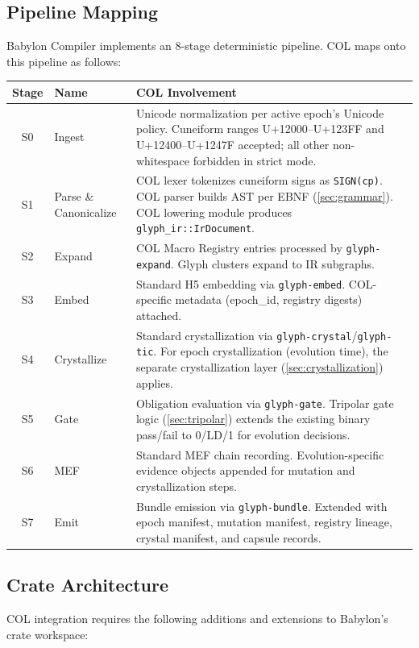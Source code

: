 \documentclass[11pt,a4paper,twoside]{article}
\theoremstyle{definition}
\theoremstyle{remark}
\begin{document}
\subsection{Pipeline Mapping}

Babylon Compiler implements an 8-stage deterministic pipeline. COL maps onto this pipeline as follows:

\begin{longtable}{clp{8.5cm}}
\toprule
\textbf{Stage} & \textbf{Name} & \textbf{COL Involvement} \\
\midrule
\endfirsthead
S0 & Ingest & Unicode normalization per active epoch's Unicode policy. Cuneiform ranges U+12000--U+123FF and U+12400--U+1247F accepted; all other non-whitespace forbidden in strict mode. \\
S1 & Parse \& Canonicalize & COL lexer tokenizes cuneiform signs as \texttt{SIGN(cp)}. COL parser builds AST per EBNF (\cref{sec:grammar}). COL lowering module produces \texttt{glyph\_ir::IrDocument}. \\
S2 & Expand & COL Macro Registry entries processed by \texttt{glyph-expand}. Glyph clusters expand to IR subgraphs. \\
S3 & Embed & Standard H5 embedding via \texttt{glyph-embed}. COL-specific metadata (epoch\_id, registry digests) attached. \\
S4 & Crystallize & Standard crystallization via \texttt{glyph-crystal}/\texttt{glyph-tic}. For epoch crystallization (evolution time), the separate crystallization layer (\cref{sec:crystallization}) applies. \\
S5 & Gate & Obligation evaluation via \texttt{glyph-gate}. Tripolar gate logic (\cref{sec:tripolar}) extends the existing binary pass/fail to 0/LD/1 for evolution decisions. \\
S6 & MEF & Standard MEF chain recording. Evolution-specific evidence objects appended for mutation and crystallization steps. \\
S7 & Emit & Bundle emission via \texttt{glyph-bundle}. Extended with epoch manifest, mutation manifest, registry lineage, crystal manifest, and capsule records. \\
\bottomrule
\end{longtable}

\subsection{Crate Architecture}
\label{sec:crate-arch}

COL integration requires the following additions and extensions to Babylon's crate workspace:
\end{document}
